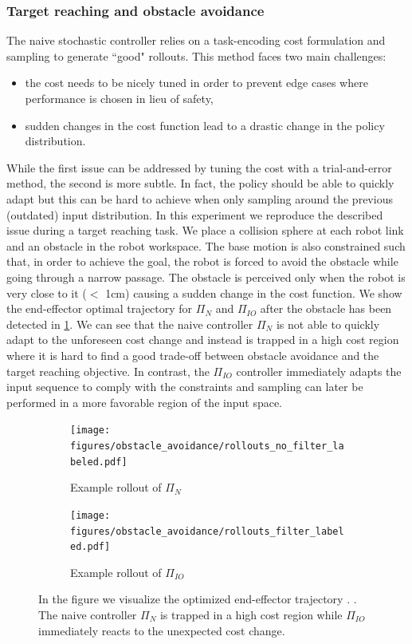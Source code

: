 \subsubsection{Target reaching and obstacle avoidance}
The naive stochastic controller relies on a task-encoding cost formulation and sampling to generate ``good" rollouts. This method faces two main challenges:
\begin{itemize}
    \item the cost needs to be nicely tuned in order to prevent edge cases where performance is chosen in lieu of safety,
    \item sudden changes in the cost function lead to a drastic change in the policy distribution.
\end{itemize}
While the first issue can be addressed by tuning the cost with a trial-and-error method, the second is more subtle. In fact, the policy should be able to quickly adapt but this can be hard to achieve when only sampling around the previous (outdated) input distribution. In this experiment we reproduce the described issue during a target reaching task. We place a collision sphere at each robot link and an obstacle in the robot workspace. The base motion is also constrained such that, in order to achieve the goal, the robot is forced to avoid the obstacle while going through a narrow passage. The obstacle is perceived only when the robot is very close to it ($<$ 1cm) causing a sudden change in the cost function. We show the end-effector optimal trajectory for $\Pi_{N}$ and $\Pi_{IO}$ after the obstacle has been detected in \fig \ref{fig:rollouts_comparison}. We can see that the naive controller $\Pi_{N}$ is not able to quickly adapt to the unforeseen cost change and instead is trapped in a high cost region where it is hard to find a good trade-off between obstacle avoidance and the target reaching objective. In contrast, the $\Pi_{IO}$ controller immediately adapts the input sequence to comply with the constraints and sampling can later be performed in a more favorable region of the input space.   

\begin{figure}[t]
\centering
\begin{subfigure}{0.48\columnwidth}
    \texttt{[image: figures/obstacle\_avoidance/rollouts\_no\_filter\_labeled.pdf]}
    \caption{Example rollout of $\Pi_{N}$}
\end{subfigure}%
\hfill
\begin{subfigure}{0.48\columnwidth}
    \texttt{[image: figures/obstacle\_avoidance/rollouts\_filter\_labeled.pdf]}
    \caption{Example rollout of $\Pi_{IO}$}
\end{subfigure}%
\hfill
\caption{In the figure we visualize the optimized end-effector trajectory .  .   The naive controller $\Pi_{N}$ is trapped in a high cost region while $\Pi_{IO}$ immediately reacts to the unexpected cost change.}\label{fig:rollouts_comparison}
\end{figure}

